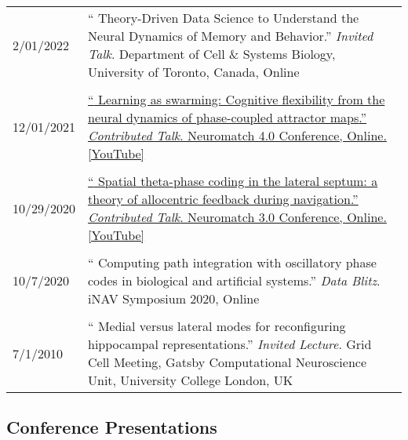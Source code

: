 \documentclass[10pt]{article}
\newcommand{\itemtitle}[1]{{\color{hopkinsblue}\ul{#1}}}
\newcommand{\unpubtitle}[1]{{\color{hopkinsblue} #1}}
\begin{document}
\begin{tabular}{@{\hspace{0.2in}}l>{\raggedright\arraybackslash}p{}}
  2/01/2022 \hspace{0.2in} & ``\unpubtitle{Theory-Driven Data Science to
    Understand the Neural Dynamics of Memory and Behavior}.'' \emph{Invited Talk}.
    Department of Cell \& Systems Biology, University of Toronto, Canada, Online \\
  \tabularnewline
  12/01/2021 \hspace{0.2in} &
  \href{https://youtu.be/3mKkLksOyfk}{``\unpubtitle{Learning as swarming:
      Cognitive flexibility from the neural dynamics of phase-coupled attractor
    maps}.'' \emph{Contributed Talk}. Neuromatch 4.0 Conference, Online.
  \itemtitle{[YouTube]}}\\
  \tabularnewline
  10/29/2020 \hspace{0.2in} &
  \href{https://www.youtube.com/watch?v=WwYDMpD7j4Q}{``\unpubtitle{Spatial
      theta-phase coding in the lateral septum: a theory of allocentric feedback
    during navigation}.'' \emph{Contributed Talk}. Neuromatch 3.0 Conference,
  Online. \itemtitle{[YouTube]}}\\
  \tabularnewline
  10/7/2020 \hspace{0.2in} & ``\unpubtitle{Computing path integration with
  oscillatory phase codes in biological and artificial systems}.'' \emph{Data
  Blitz}. iNAV Symposium 2020, Online\\
  \tabularnewline
  7/1/2010 \hspace{0.2in} & ``\unpubtitle{Medial versus lateral modes for
  reconfiguring hippocampal representations}.'' \emph{Invited Lecture}. Grid
  Cell Meeting, Gatsby Computational Neuroscience Unit, University College
  London, UK\\
\end{tabular}

\subsection*{Conference Presentations}
\label{sec:presentations}
\end{document}
